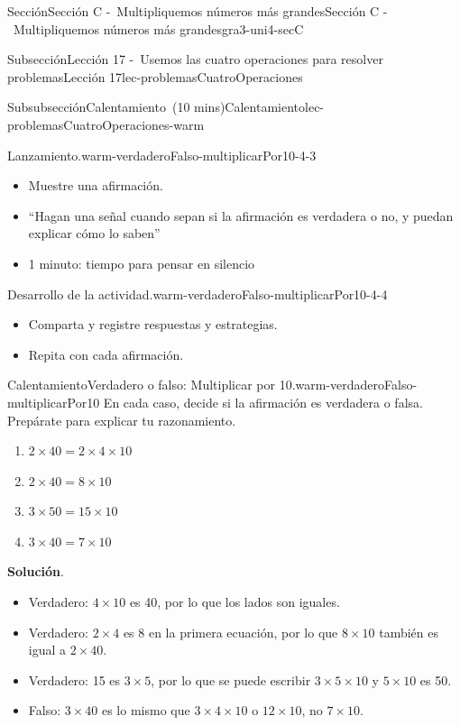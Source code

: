 \documentclass[oneside,10pt,]{article}
\newcommand{\blocktitlefont}{\relax}
\begin{document}
\begin{sectionptx}{Sección}{Sección C -~Multipliquemos números más grandes}{}{Sección C -~Multipliquemos números más grandes}{}{}{gra3-uni4-secC}
\begin{subsectionptx}{Subsección}{Lección 17 -~Usemos las cuatro operaciones para resolver problemas}{}{Lección 17}{}{}{lec-problemasCuatroOperaciones}
\begin{subsubsectionptx}{Subsubsección}{Calentamiento~(10 mins)}{}{Calentamiento}{}{}{lec-problemasCuatroOperaciones-warm}
\begin{paragraphs}{Lanzamiento.}{warm-verdaderoFalso-multiplicarPor10-4-3}
%
\begin{itemize}[label=\textbullet]
\item{}Muestre una afirmación.%
\item{}``Hagan una señal cuando sepan si la afirmación es verdadera o no, y puedan explicar cómo lo saben''%
\item{}1 minuto: tiempo para pensar en silencio%
\end{itemize}
\end{paragraphs}%
\begin{paragraphs}{Desarrollo de la actividad.}{warm-verdaderoFalso-multiplicarPor10-4-4}%
%
\begin{itemize}[label=\textbullet]
\item{}Comparta y registre respuestas y estrategias.%
\item{}Repita con cada afirmación.%
\end{itemize}
\end{paragraphs}%
\begin{exploration}{Calentamiento}{Verdadero o falso: Multiplicar por 10.}{warm-verdaderoFalso-multiplicarPor10}%
En cada caso, decide si la afirmación es verdadera o falsa. Prepárate para explicar tu razonamiento.%
%
\begin{enumerate}[label={\Alph*.}]
\item{}\(\displaystyle 2 \times 40 = 2 \times 4 \times 10\)%
\item{}\(\displaystyle 2 \times 40 = 8 \times 10\)%
\item{}\(\displaystyle 3 \times 50 = 15 \times 10\)%
\item{}\(\displaystyle 3 \times 40 = 7 \times 10\)%
\end{enumerate}
\par\smallskip%
\noindent\textbf{\blocktitlefont Solución}.\hypertarget{warm-verdaderoFalso-multiplicarPor10-3}{}\quad{}%
\begin{itemize}[label=\textbullet]
\item{}Verdadero: \(4 \times 10\) es 40, por lo que los lados son iguales.%
\item{}Verdadero: \(2 \times 4\) es 8 en la primera ecuación, por lo que \(8 \times 10\) también es igual a \(2 \times 40\).%
\item{}Verdadero: 15 es \(3 \times 5\), por lo que se puede escribir \(3 \times 5 \times 10\) y \(5 \times 10\) es 50.%
\item{}Falso: \(3 \times 40\) es lo mismo que \(3 \times 4 \times 10\) o \(12 \times 10\), no \(7 \times 10\).%
\end{itemize}

\end{exploration}
\end{subsubsectionptx}
\end{subsectionptx}
\end{sectionptx}
\end{document}
